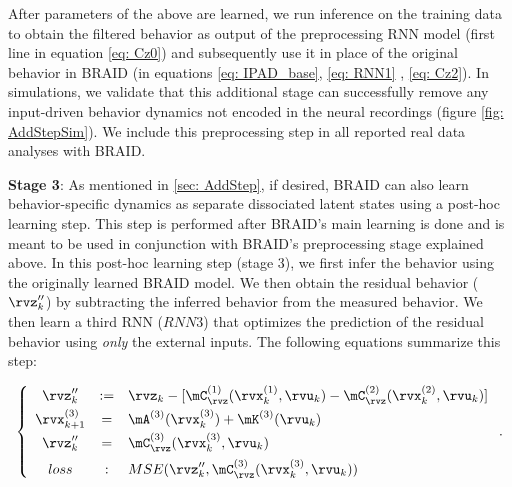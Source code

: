 \documentclass{article} %
\newcommand{\RNN}[1]{\(\textit{RNN#1}\)} %
\newcommand{\ourmethod}{BRAID}
\begin{document}
After parameters of the above are learned, we run inference on the training data to obtain the filtered behavior as output of the preprocessing RNN model (first line in equation \ref{eq: Cz0}) and subsequently use it in place of the original behavior in \ourmethod{} (in equations \ref{eq: IPAD_base}, \ref{eq: RNN1} , \ref{eq: Cz2}). In simulations, we validate that this additional stage can successfully remove any input-driven behavior dynamics not encoded in the neural recordings (figure \ref{fig: AddStepSim}). We include  this preprocessing step in all reported real data analyses with \ourmethod{}.

\textbf{Stage 3}\label{stage3}:
As mentioned in \ref{sec: AddStep}, if desired, \ourmethod{} can also learn behavior-specific dynamics as separate dissociated latent states using a post-hoc learning step. This step is performed after \ourmethod{}'s main learning is done and is meant to be used in conjunction with \ourmethod{}’s preprocessing stage explained above.
In this post-hoc learning step (stage 3), we first infer the behavior using the originally learned \ourmethod{} model. We then obtain the residual behavior (\(\rvz''_{k}\)) by subtracting the inferred behavior from the measured behavior. We then learn a third RNN (\RNN3) that optimizes the prediction of the residual behavior using \textit{only} the external inputs. The following equations summarize this step:


\begin{equation}\label{eq: IPAD_x3}
    \left\{
    \begin{array}{ccl}
    \rvz''_{k} &:=& \rvz_{k} - [\mC_{\rvz}^{(1)}(\rvx_{k}^{(1)}, \rvu_{k}) - \mC_{\rvz}^{(2)}(\rvx_{k}^{(2)}, \rvu_{k})]\\ [3pt]
    \rvx_{k+1}^{(3)} &=& \mA^{(3)}(\rvx_{k}^{(3)}) + \mK^{(3)}(\rvu_{k})\\[3pt]  
    \rvz''_{k} &=& \mC_{\rvz}^{(3)}(\rvx_{k}^{(3)},\rvu_{k})\\[5pt]
    loss&:& MSE(\rvz''_{k}, \mC_{\rvz}^{(3)}(\rvx_{k}^{(3)},\rvu_{k}))
    \end{array}
    \right.
    .
\end{equation}
\end{document}
